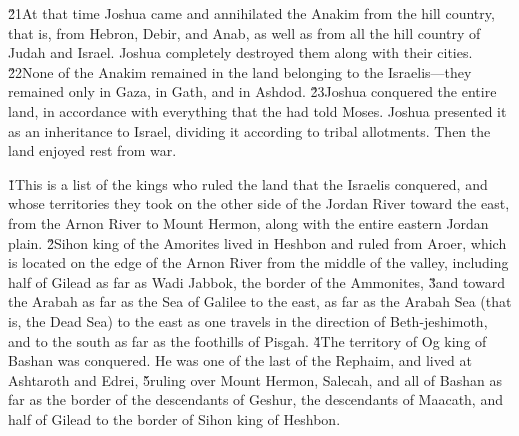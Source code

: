 \v{21}At that time Joshua came and annihilated the Anakim from the hill country, that is, from Hebron, Debir, and Anab, as well as from all the hill country of Judah and Israel. Joshua completely destroyed them along with their cities. \v{22}None of the Anakim remained in the land belonging to the Israelis---they remained only in Gaza, in Gath, and in Ashdod. \v{23}Joshua conquered the entire land, in accordance with everything that the  had told Moses. Joshua presented it as an inheritance to Israel, dividing it according to tribal allotments. Then the land enjoyed rest from war.

\v{1}This is a list of the kings who ruled the land that the Israelis conquered, and whose territories they took on the other side of the Jordan River toward the east, from the Arnon River to Mount Hermon, along with the entire eastern Jordan plain. \v{2}Sihon king of the Amorites lived in Heshbon and ruled from Aroer, which is located on the edge of the Arnon River from the middle of the valley, including half of Gilead as far as Wadi Jabbok, the border of the Ammonites, \v{3}and toward the Arabah as far as the Sea of Galilee to the east, as far as the Arabah Sea (that is, the Dead Sea) to the east as one travels in the direction of Beth-jeshimoth, and to the south as far as the foothills of Pisgah. \v{4}The territory of Og king of Bashan was conquered. He was one of the last of the Rephaim, and lived at Ashtaroth and Edrei, \v{5}ruling over Mount Hermon, Salecah, and all of Bashan as far as the border of the descendants of Geshur, the descendants of Maacath, and half of Gilead to the border of Sihon king of Heshbon.

